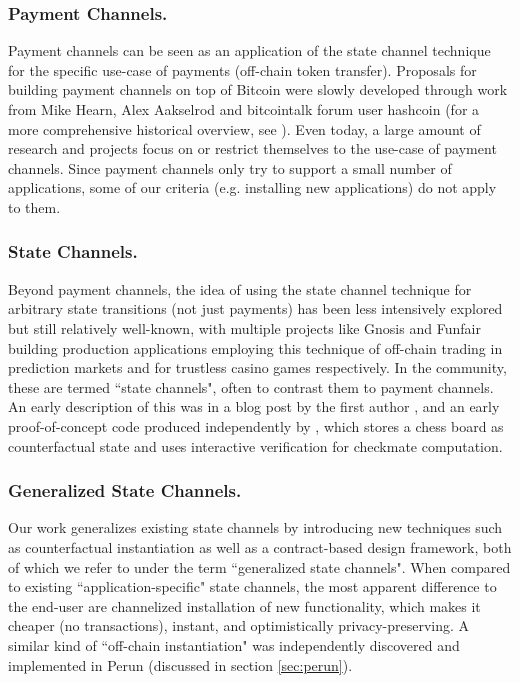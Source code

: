 \documentclass[prb,floatfix,reprint,nofootinbib,amsmath,amssymb,epsfig,pre,floats,letterpaper,groupedaffiliation,tightenlines,allcolors=blue,11pt]{revtex4}
\theoremstyle{definition}
\theoremstyle{definition}
\theoremstyle{definition}
\begin{document}
\subsubsection{Payment Channels.} Payment channels can be seen as an application of the state channel technique for the specific use-case of payments (off-chain token transfer). Proposals for building payment channels on top of Bitcoin were slowly developed through work from Mike Hearn, Alex Aakselrod and bitcointalk forum user hashcoin (for a more comprehensive historical overview, see \cite{bitcoinmagazine:history_of_lightning}). Even today, a large amount of research and projects focus on or restrict themselves to the use-case of payment channels. Since payment channels only try to support a small number of applications, some of our criteria (e.g. installing new applications) do not apply to them.

\subsubsection{State Channels.} Beyond payment channels, the idea of using the state channel technique for arbitrary state transitions (not just payments) has been less intensively explored but still relatively well-known, with multiple projects like Gnosis \cite{gnosisforum:offchain} and Funfair \cite{funfair} building production applications employing this technique of off-chain trading in prediction markets and for trustless casino games respectively. In the community, these are termed ``state channels", often to contrast them to payment channels. An early description of this was in a blog post by the first author \cite{jeffcoleman:statechannels}, and an early proof-of-concept code produced independently by \cite{chess}, which stores a chess board as counterfactual state and uses interactive verification for checkmate computation.

\subsubsection{Generalized State Channels.} Our work generalizes existing state channels by introducing new techniques such as counterfactual instantiation as well as a contract-based design framework, both of which we refer to under the term ``generalized state channels". When compared to existing ``application-specific" state channels, the most apparent difference to the end-user are channelized installation of new functionality, which makes it cheaper (no transactions), instant, and optimistically privacy-preserving. A similar kind of ``off-chain instantiation" was independently discovered and implemented in Perun \cite{perun} (discussed in section \ref{sec:perun}).
\end{document}
